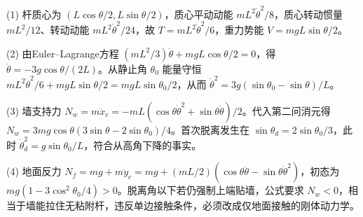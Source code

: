 (1) 杆质心为 \((L\cos\theta/2,L\sin\theta/2)\)，质心平动动能 \(mL^2\dot\theta^2/8\)，质心转动惯量 \(mL^2/12\)、转动动能 \(mL^2\dot\theta^2/24\)，故 \(\boxed{T=mL^2\dot\theta^2/6}\)，重力势能 \(V=mgL\sin\theta/2\)。

(2) 由Euler–Lagrange方程 \((mL^2/3)\ddot\theta+mgL\cos\theta/2=0\)，得 \(\boxed{\ddot\theta=-3g\cos\theta/(2L)}\)。从静止角 \(\theta_0\) 能量守恒 \(mL^2\dot\theta^2/6+mgL\sin\theta/2=mgL\sin\theta_0/2\)，从而 \(\boxed{\dot\theta^2=3g(\sin\theta_0-\sin\theta)/L}\)。

(3) 墙支持力 \(N_w=m\ddot x_c=-mL(\cos\theta\dot\theta^2+\sin\theta\ddot\theta)/2\)。代入第二问消元得 \(\boxed{N_w=3mg\cos\theta(3\sin\theta-2\sin\theta_0)/4}\)。首次脱离发生在 \(\boxed{\sin\theta_d=2\sin\theta_0/3}\)，此时 \(\dot\theta_d^2=g\sin\theta_0/L\)，符合从高角下降的事实。

(4) 地面反力 \(N_f=mg+m\ddot y_c=mg+(mL/2)(\cos\theta\ddot\theta-\sin\theta\dot\theta^2)\)，初态为 \(mg(1-3\cos^2\theta_0/4)>0\)。脱离角以下若仍强制上端贴墙，公式要求 \(N_w<0\)，相当于墙能拉住无粘附杆，违反单边接触条件，必须改成仅地面接触的刚体动力学。
